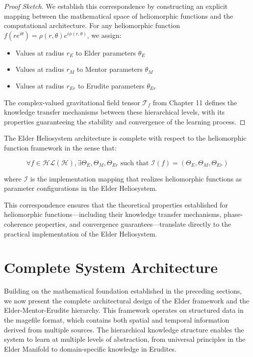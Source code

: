 \begin{proof}[Proof Sketch]
We establish this correspondence by constructing an explicit mapping between the mathematical space of heliomorphic functions and the computational architecture. For any heliomorphic function $f(re^{i\theta}) = \rho(r,\theta)e^{i\phi(r,\theta)}$, we assign:
\begin{itemize}
    \item Values at radius $r_E$ to Elder parameters $\theta_E$
    \item Values at radius $r_M$ to Mentor parameters $\theta_M$
    \item Values at radius $r_{Er}$ to Erudite parameters $\theta_{Er}$
\end{itemize}

The complex-valued gravitational field tensor $\mathcal{T}_f$ from Chapter 11 defines the knowledge transfer mechanisms between these hierarchical levels, with its properties guaranteeing the stability and convergence of the learning process.
\end{proof}

\begin{theorem}
The Elder Heliosystem architecture is complete with respect to the heliomorphic function framework in the sense that:

\begin{equation}
\forall f \in \mathcal{HL}(\mathcal{H}), \exists \Theta_E, \Theta_M, \Theta_{Er} \text{ such that } \mathcal{I}(f) = (\Theta_E, \Theta_M, \Theta_{Er})
\end{equation}

where $\mathcal{I}$ is the implementation mapping that realizes heliomorphic functions as parameter configurations in the Elder Heliosystem.
\end{theorem}

This correspondence ensures that the theoretical properties established for heliomorphic functions—including their knowledge transfer mechanisms, phase-coherence properties, and convergence guarantees—translate directly to the practical implementation of the Elder Heliosystem.

\section{Complete System Architecture}

Building on the mathematical foundation established in the preceding sections, we now present the complete architectural design of the Elder framework and the Elder-Mentor-Erudite hierarchy. This framework operates on structured data in the magefile format, which contains both spatial and temporal information derived from multiple sources. The hierarchical knowledge structure enables the system to learn at multiple levels of abstraction, from universal principles in the Elder Manifold to domain-specific knowledge in Erudites.

